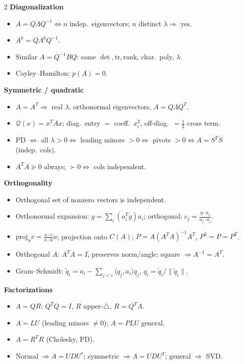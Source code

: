 \documentclass[hidelinks]{article}
\begin{document}
\begin{multicols}{2}
\textbf{\color{Thistle}Diagonalization}
\begin{itemize}[leftmargin=1.1em,itemsep=1pt,topsep=1pt]
    \item $A=Q\Lambda Q^{-1}\iff n$ indep.\ eigenvectors; $n$ distinct $\lambda\Rightarrow$ yes.
    \item $A^k=Q\Lambda^kQ^{-1}$.
    \item Similar $A=Q^{-1}BQ$: same $\det,\mathrm{tr},\mathrm{rank}$, char.\ poly, $\lambda$.
    \item Cayley--Hamilton: $p(A)=0$.
\end{itemize}

\textbf{\color{Thistle}Symmetric / quadratic}
\begin{itemize}[leftmargin=1.1em,itemsep=1pt,topsep=1pt]
    \item $A=A^T\Rightarrow$ real $\lambda$, orthonormal eigenvectors, $A=Q\Lambda Q^T$.
    \item $\mathcal Q(x)=x^TAx$; diag.\ entry $=$ coeff.\ $x_i^2$, off-diag.\ $=\tfrac12$ cross term.
    \item PD $\iff$ all $\lambda>0 \iff$ leading minors $>0 \iff$ pivots $>0 \iff A=S^TS$ (indep.\ cols).
    \item $A^TA\succeq 0$ always; $\succ 0\iff$ cols independent.
\end{itemize}

\textbf{\color{Thistle}Orthogonality}
\begin{itemize}[leftmargin=1.1em,itemsep=1pt,topsep=1pt]
    \item Orthogonal set of nonzero vectors is independent.
    \item Orthonormal expansion: $y=\sum_i(a_i^Ty)a_i$; orthogonal: $c_j=\frac{y\cdot a_j}{a_j\cdot a_j}$.
    \item $\mathrm{proj}_u v=\frac{u\cdot v}{u\cdot u}u$; projection onto $C(A)$: $P=A(A^TA)^{-1}A^T$, $P^2=P=P^T$.
    \item Orthogonal $A$: $A^TA=I$, preserves norm/angle; square $\Rightarrow A^{-1}=A^T$.
    \item Gram--Schmidt: $\tilde q_i=a_i-\sum_{j<i}\langle q_j,a_i\rangle q_j$, $q_i=\tilde q_i/\|\tilde q_i\|$.
\end{itemize}

\textbf{\color{Thistle}Factorizations}
\begin{itemize}[leftmargin=1.1em,itemsep=1pt,topsep=1pt]
    \item $A=QR$: $Q^TQ=I$, $R$ upper-$\triangle$, $R=Q^TA$.
    \item $A=LU$ (leading minors $\neq0$); $A=PLU$ general.
    \item $A=R^TR$ (Cholesky, PD).
    \item Normal $\Rightarrow A=UDU^{*}$; symmetric $\Rightarrow A=UDU^T$; general $\Rightarrow$ SVD.
\end{itemize}


\end{multicols}
\end{document}
